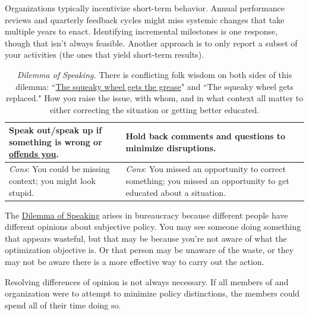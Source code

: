 Organizations typically incentivize short-term behavior. Annual performance reviews and quarterly feedback cycles might miss systemic changes that take multiple years to enact. Identifying incremental milestones is one response, though that isn't always feasible. Another approach is to only report a subset of your activities (the ones that yield short-term results). 

\begin{center}
\begin{table}[H] %
\begin{tabular}{ | m{\dilemmatablewidth}| m{\dilemmatablewidth} | } 
  \hline
  \textbf{Speak out/speak up if something is wrong or \href{https://en.wikipedia.org/wiki/Moral_injury}{offends you}.} &
  \textbf{Hold back comments and questions to minimize disruptions.} \\
  \hline
  \textit{Cons}: You could be missing context; you might look stupid. & 
  \textit{Cons}: You missed an opportunity to correct something; you missed an opportunity to get educated about a situation. \\
  \hline
\end{tabular}
\caption{
\textit{Dilemma of Speaking.}
There is conflicting folk wisdom on both sides of this dilemma: 
``\href{https://en.wikipedia.org/wiki/The_squeaky_wheel_gets_the_grease}{The squeaky wheel gets the grease}" 
and 
``The squeaky wheel gets replaced." 
How you raise the issue, with whom, and in what context all matter to either correcting the situation or getting better educated.
}
\label{table:speak-up-or-hold-back}
\end{table}
\end{center}

The \href{table:speak-up-or-hold-back}{Dilemma of Speaking} arises in bureaucracy because different people have different opinions about subjective policy. You may see someone doing something that appears wasteful, but that may be because you're not aware of what the optimization objective is. Or that person may be unaware of the waste, or they may not be aware there is a more effective way to carry out the action. 

Resolving differences of opinion is not always necessary. If all members of and organization were to attempt to minimize policy distinctions, the members could spend all of their time doing so. 

